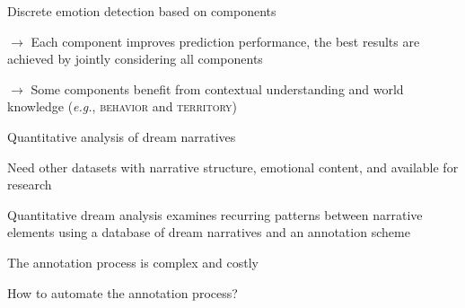 \documentclass[handout,10pt]{beamer}
\begin{document}
\begin{frame}{Discrete emotion detection based on components}
\vspace{0.5cm}
\pause

$\rightarrow$ Each component improves prediction performance, the best results are achieved by jointly considering all components

\pause

$\rightarrow$ Some components benefit from contextual understanding and world knowledge (\textit{e.g.}, \textsc{behavior} and \textsc{territory})

\end{frame}

\begin{frame}{Quantitative analysis of dream narratives}


Need other datasets with narrative structure, emotional content, and available for research

\vspace{0.5cm}
\pause

Quantitative dream analysis examines recurring patterns between narrative elements using a database of dream narratives and an annotation scheme \citep{domhoffStudyingDreamContent2008b}

\vspace{0.5cm}
\pause

The annotation process is complex and costly

\vspace{0.5cm}
\pause

How to automate the annotation process?

    
\end{frame}
\end{document}
